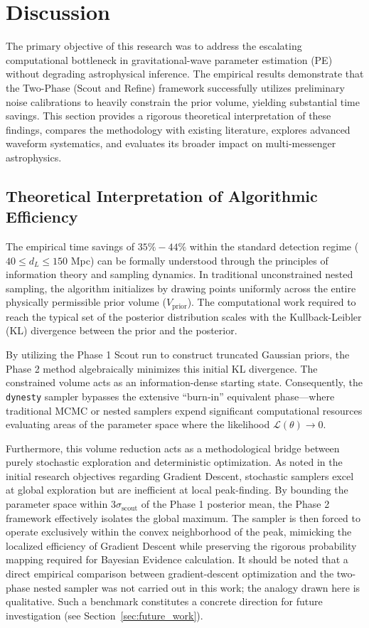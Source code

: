 \documentclass[12pt]{article}
\begin{document}
\section{Discussion}

The primary objective of this research was to address the escalating computational bottleneck in gravitational-wave parameter estimation (PE) without degrading astrophysical inference. The empirical results demonstrate that the Two-Phase (Scout and Refine) framework successfully utilizes preliminary noise calibrations to heavily constrain the prior volume, yielding substantial time savings. This section provides a rigorous theoretical interpretation of these findings, compares the methodology with existing literature, explores advanced waveform systematics, and evaluates its broader impact on multi-messenger astrophysics.

\subsection{Theoretical Interpretation of Algorithmic Efficiency}
\label{sec:theoretical_interpretation}
The empirical time savings of $35\%-44\%$ within the standard detection regime ($40 \le d_L \le 150$ Mpc) can be formally understood through the principles of information theory and sampling dynamics. In traditional unconstrained nested sampling, the algorithm initializes by drawing points uniformly across the entire physically permissible prior volume ($V_{\text{prior}}$). The computational work required to reach the typical set of the posterior distribution scales with the Kullback-Leibler (KL) divergence between the prior and the posterior.

By utilizing the Phase 1 Scout run to construct truncated Gaussian priors, the Phase 2 method algebraically minimizes this initial KL divergence. The constrained volume acts as an information-dense starting state. Consequently, the \texttt{dynesty} sampler bypasses the extensive ``burn-in'' equivalent phase---where traditional MCMC or nested samplers expend significant computational resources evaluating areas of the parameter space where the likelihood $\mathcal{L}(\theta) \to 0$.

Furthermore, this volume reduction acts as a methodological bridge between purely stochastic exploration and deterministic optimization. As noted in the initial research objectives regarding Gradient Descent, stochastic samplers excel at global exploration but are inefficient at local peak-finding. By bounding the parameter space within $3\sigma_{\mathrm{scout}}$ of the Phase 1 posterior mean, the Phase 2 framework effectively isolates the global maximum. The sampler is then forced to operate exclusively within the convex neighborhood of the peak, mimicking the localized efficiency of Gradient Descent while preserving the rigorous probability mapping required for Bayesian Evidence calculation. It should be noted that a direct empirical comparison between gradient-descent optimization and the two-phase nested sampler was not carried out in this work; the analogy drawn here is qualitative. Such a benchmark constitutes a concrete direction for future investigation (see Section~\ref{sec:future_work}).
\end{document}
